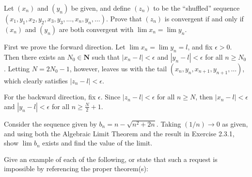 \begin{exercise}
  Let $\left(x_{n}\right)$ and $\left(y_{n}\right)$ be given, and define $\left(z_{n}\right)$ to be the ``shuffled'' sequence $\left(x_{1}, y_{1}, x_{2}, y_{2}, x_{3}, y_{3}, \ldots, x_{n}, y_{n}, \ldots\right)$. Prove that $\left(z_{n}\right)$ is convergent if and only if $\left(x_{n}\right)$ and $\left(y_{n}\right)$ are both convergent with $\lim x_{n}=\lim y_{n}$.
\end{exercise}

\begin{solution}
  First we prove the forward direction. Let $\lim x_n = \lim y_n = l$, and fix $\epsilon>0$. Then there exists an $N_0\in\mathbf{N}$ such that $|x_n - l| <\epsilon$ and $|y_n-l|<\epsilon$ for all $n\geq N_0$. Letting $N=2N_0-1$, however, leaves us with the tail $(x_n, y_n, x_{n+1}, y_{n+1}, \ldots)$, which clearly satisfies $|z_n-l|<\epsilon$.

  For the backward direction, fix $\epsilon$. Since $|z_n - l| <\epsilon$ for all $n\geq N$, then $|x_n - l| <\epsilon$ and $|y_n-l|<\epsilon$ for all $n \geq \frac{N}{2} + 1$.
\end{solution}

\begin{exercise}
  Consider the sequence given by $b_{n}=n-\sqrt{n^{2}+2 n}$. Taking $(1 / n) \rightarrow 0$ as given, and using both the Algebraic Limit Theorem and the result in Exercise 2.3.1, show $\lim b_{n}$ exists and find the value of the limit.
\end{exercise}

\begin{solution}

\end{solution}

\begin{exercise}
  Give an example of each of the following, or state that such a request is impossible by referencing the proper theorem(s):
\end{exercise}

